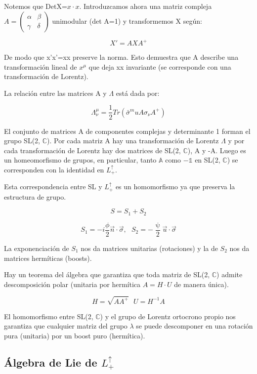 \begin{itemize}
Notemos que DetX=$x\cdot x$. Introduzcamos ahora una matriz compleja $A=\left ( \begin{array}{cc}
     \alpha & \beta \\
    \gamma & \delta
\end{array}\right)$ unimodular (det A=1) y transformemos X según:

$$X'=AXA^+$$

De modo que x'x'=xx preserve la norma. Esto demuestra que A describe una transformación lineal de $x^\mu$ que deja xx invariante (se corresponde con una transformación de Lorentz).

\newpage
La relación entre las matrices A y $\Lambda$ está dada por:

$$\Lambda _\nu ^\mu =\frac{1}{2}Tr(\bar{\sigma}^mu A \sigma _\nu A^+)$$

El conjunto de matrices A de componentes complejas y determinante 1 forman el grupo SL(2, $\mathds{C}$). Por cada matriz A hay una transformación de Lorentz $\Lambda$ y por cada transformación de Lorentz hay dos matrices de SL(2, $\mathds{C}$), A y -A. Luego es un homeomorfismo de grupos, en particular, tanto $\mathds{A}$ como $-\mathds{1}$ en SL(2, $\mathds{C}$) se corresponden con la identidad en $L_+^\uparrow$.

Esta correspondencia entre SL y $L_+^\uparrow$ es un homomorfismo ya que preserva la estructura de grupo.

$$S=S_1+S_2$$

$$S_1=-i\frac{\phi}{2}\Vec{n}\cdot \Vec{\sigma}, \ \ \ S_2=-\frac{\uppsi}{2}\Vec{u}\cdot \Vec{\sigma}$$

La exponenciación de $S_1$ nos da matrices unitarias (rotaciones) y la de $S_2$ nos da matrices hermíticas (boosts).

\smallskip
Hay un teorema del álgebra que garantiza que toda matriz de SL(2, $\mathds{C}$) admite descomposición polar (unitaria por hermítica $A=H\cdot U$ de manera única).

$$H=\sqrt{AA^+} \ \ \ U=H^{-1}A$$

El homomorfismo entre SL(2, $\mathds{C}$) y el grupo de Lorentz ortocrono propio nos garantiza que cualquier matriz del grupo $\lambda$ se puede descomponer en una rotación pura (unitaria) por un boost puro (hermítica).

\end{itemize}

\subsection{Álgebra de Lie de $L^\uparrow_+$}


